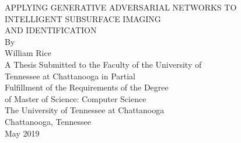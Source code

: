 \begin{titlepage}
    \begin{center}
        \vspace{\baselineskip}
        \vspace{\baselineskip}
        \vspace{\baselineskip}
        \vspace{\baselineskip}
        \vspace{\baselineskip}
        APPLYING GENERATIVE ADVERSARIAL NETWORKS TO \\
        \vspace{\baselineskip}
        INTELLIGENT SUBSURFACE IMAGING\\
        \vspace{\baselineskip}
        AND IDENTIFICATION\\
        \vspace{\baselineskip}
        \vspace{\baselineskip}
        \vspace{\baselineskip}
        \vspace{\baselineskip}
        \vspace{\baselineskip}
        By \\
        \vspace{\baselineskip}
        William Rice\\
        \vspace{\baselineskip}
        \vspace{\baselineskip}
        \vspace{\baselineskip}
        \vspace{\baselineskip}
        \vspace{\baselineskip}
        A Thesis Submitted to the Faculty of the University of \\
        Tennessee at Chattanooga in Partial  \\
        Fulfillment of the Requirements of the Degree \\
        of Master of Science: Computer Science \\
        \vspace{\baselineskip}
        \vspace{\baselineskip}
        \vspace{\baselineskip}
        \vspace{\baselineskip}
        \vspace{\baselineskip}
        \vspace{\baselineskip}
        The University of Tennessee at Chattanooga \\
        Chattanooga, Tennessee \\
        \vspace{\baselineskip}
        May 2019 \\
    \end{center}
\end{titlepage}